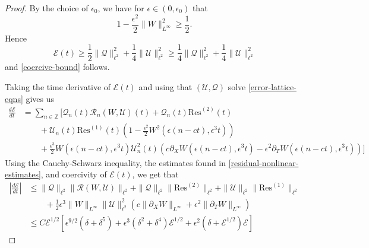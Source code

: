 \begin{proof}
	By the choice of \(\epsilon_0\), we have for \(\epsilon\in(0,\epsilon_0)\) that 
	\begin{equation}
		1 - \frac{\epsilon^2} 2 \| W \|_{L^\infty}^2 \geq \frac 12.
	\end{equation}
	Hence
	\begin{equation}
		\mathcal E(t) \geq \frac 1 2 \| \mathcal Q \|_{\ell^2}^2 + \frac 1 4 \| \mathcal U\|_{\ell^2}^2 \geq \frac 1 4\| \mathcal Q \|_{\ell^2}^2 + \frac 1 4 \| \mathcal U\|_{\ell^2}^2
	\end{equation}
	and \cref{coercive-bound} follows.
	
	Taking the time derivative of \(\mathcal E(t)\) and using that \((\mathcal U, \mathcal Q)\) solve \cref{error-lattice-eqns} gives us 
	\begin{equation}
	\begin{aligned}
		\frac{d \mathcal E}{dt} &= \sum_{n\in \mathbb{Z}} \Bigg[ \mathcal Q_n(t) \mathcal R_n(W,\mathcal U)(t) + \mathcal Q_n(t) \mathrm{Res}^{(2)}(t) \\
		&\qquad+ \mathcal U_n(t) \mathrm{Res}^{(1)}(t) \left( 1 - \frac{\epsilon^2} 2 W^2(\epsilon(n-ct),\epsilon^3 t) \right) \\
		&\qquad+\frac{\epsilon^3} 2 W(\epsilon(n-ct), \epsilon^3t) \mathcal U_n^2 (t) \left( c\partial_X W(\epsilon(n-ct),\epsilon^3 t) - \epsilon^2 \partial_TW(\epsilon(n-ct), \epsilon^3 t) \right) \Bigg]
	\end{aligned}	
	\end{equation}
	Using the Cauchy-Schwarz inequality, the estimates found in \cref{residual-nonlinear-estimates}, and coercivity of \(\mathcal E(t)\), we get that 
	\begin{equation}
	\begin{aligned}
		\left|\frac{d\mathcal E}{dt} \right| &\leq \|\mathcal Q\|_{\ell^2} \|\mathcal R(W,\mathcal U)\|_{\ell^2} + \|\mathcal Q\|_{\ell^2} \|\mathrm{Res}^{(2)}\|_{\ell^2} + \| \mathcal U \|_{\ell^2} \|\mathrm{Res}^{(1)}\|_{\ell^2} \\
		&\qquad+ \frac 1 2 \epsilon^3 \| W \|_{L^\infty} \|\mathcal U\|_{\ell^2}^2 ( c \|\partial_X W\|_{L^\infty} + \epsilon^2 \|\partial_T W\|_{L^\infty}) \\
		&\leq C \mathcal E^{1/2}\left[ \epsilon^{9/2} (\delta + \delta^5)  + \epsilon^3(\delta^2 + \delta^4) \mathcal E^{1/2} + \epsilon^2(\delta + \mathcal{E}^{1/2})\mathcal E\right]
	\end{aligned}
	\end{equation}
\end{proof}

